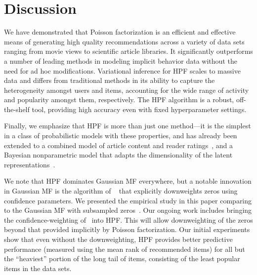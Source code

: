 \section{Discussion}
We have demonstrated that Poisson factorization is an efficient and
effective means of generating high quality recommendations across a
variety of data sets ranging from movie views to scientific article
libraries. It significantly outperforms a number of leading methods in
modeling implicit behavior data without the need for ad hoc
modifications. Variational inference for HPF scales to massive data
and differs from traditional methods in its ability to capture the
heterogeneity amongst users and items, accounting for the wide range
of activity and popularity amongst them, respectively. The HPF
algorithm is a robust, off-the-shelf tool, providing high accuracy
even with fixed hyperparameter settings.


Finally, we emphasize that HPF is more than just one method---it is
the simplest in a class of probabilistic models with these properties,
and has already been extended to a combined model of article content
and reader ratings~\cite{gopalan2014content}, and a Bayesian
nonparametric model that adapts the dimensionality of the latent
representations~\cite{gopalan2014bayesian}.

We note that HPF dominates Gaussian MF everywhere, but a notable
innovation in Gaussian MF is the algorithm of ~\cite{Hu:2008p9402}
that explicitly downweights zeros using confidence parameters. We
presented the empirical study in this paper comparing to the Gaussian
MF with subsampled zeros~\cite{Koren:2009}. Our ongoing work includes
bringing the confidence-weighting of~\cite{Hu:2008p9402} into HPF.
This will allow downweighting of the zeros beyond that provided
implicitly by Poisson factorization. Our initial experiments show that
even without the downweighting, HPF provides better predictive
performance (measured using the mean rank of recommended items) for
all but the ``heaviest'' portion of the long tail of items, consisting
of the least popular items in the data sets.


